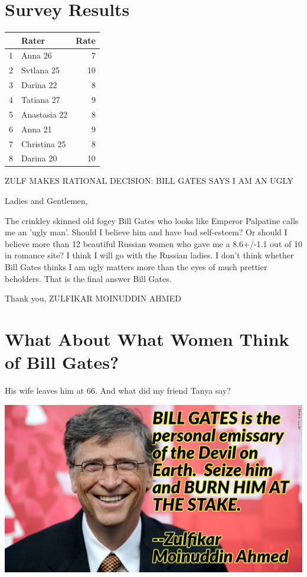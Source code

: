 \documentclass{amsart}
\author{Zulfikar Moinuddin Ahmed}
\date{\today}
\begin{document}
\maketitle

\section{Survey Results}

\begin{table}[ht]
\centering
\begin{tabular}{rlr}
  \hline
 & Rater & Rate \\ 
  \hline
1 & Anna 26 &   7 \\ 
  2 & Svtlana 25 &  10 \\ 
  3 & Darina 22 &   8 \\ 
  4 & Tatiana 27 &   9 \\ 
  5 & Anastasia 22 &   8 \\ 
  6 & Anna 21 &   9 \\ 
  7 & Christina 25 &   8 \\ 
  8 & Darina 20 &  10 \\ 
   \hline
\end{tabular}
\end{table}

ZULF MAKES RATIONAL DECISION: BILL GATES SAYS I AM AN UGLY 

Ladies and Gentlemen,

The crinkley skinned old fogey Bill Gates who looks like Emperor Palpatine calls me an 'ugly man'.  Should I believe him and have bad self-esteem?  Or should I believe more than 12 beautiful Russian women who gave me a 8.6+/-1.1 out of 10 in  romance site?  I think I will go with the Russian ladies.  I don't think whether Bill Gates thinks I am ugly matters more than the eyes of much prettier beholders.  That is the final answer Bill Gates.

Thank you,
ZULFIKAR MOINUDDIN AHMED

\section{What About What Women Think of Bill Gates?}

His wife leaves him at 66.  And what did my friend Tanya say?

\includegraphics[scale=0.4]{devil.jpg}
\end{document}
